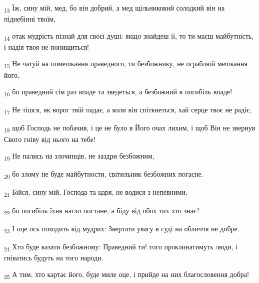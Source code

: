 \begin{tcolorbox}
\textsubscript{13} Їж, сину мій, мед, бо він добрий, а мед щільниковий солодкий він на піднебінні твоїм,
\end{tcolorbox}
\begin{tcolorbox}
\textsubscript{14} отак мудрість пізнай для своєї душі: якщо знайдеш її, то ти маєш майбутність, і надія твоя не понищиться!
\end{tcolorbox}
\begin{tcolorbox}
\textsubscript{15} Не чатуй на помешкання праведного, ти безбожнику, не ограблюй мешкання його,
\end{tcolorbox}
\begin{tcolorbox}
\textsubscript{16} бо праведний сім раз впаде та зведеться, а безбожний в погибіль впаде!
\end{tcolorbox}
\begin{tcolorbox}
\textsubscript{17} Не тішся, як ворог твій падає, а коли він спіткнеться, хай серце твоє не радіє,
\end{tcolorbox}
\begin{tcolorbox}
\textsubscript{18} щоб Господь не побачив, і це не було в Його очах лихим, і щоб Він не звернув Свого гніву від нього на тебе!
\end{tcolorbox}
\begin{tcolorbox}
\textsubscript{19} Не пались на злочинців, не заздри безбожним,
\end{tcolorbox}
\begin{tcolorbox}
\textsubscript{20} бо злому не буде майбутности, світильник безбожних погасне.
\end{tcolorbox}
\begin{tcolorbox}
\textsubscript{21} Бійся, сину мій, Господа та царя, не водися з непевними,
\end{tcolorbox}
\begin{tcolorbox}
\textsubscript{22} бо погибіль їхня нагло постане, а біду від обох тих хто знає?
\end{tcolorbox}
\begin{tcolorbox}
\textsubscript{23} І оце ось походить від мудрих: Звертати увагу в суді на обличчя не добре.
\end{tcolorbox}
\begin{tcolorbox}
\textsubscript{24} Хто буде казати безбожному: Праведний ти! того проклинатимуть люди, і гніватись будуть на того народи.
\end{tcolorbox}
\begin{tcolorbox}
\textsubscript{25} А тим, хто картає його, буде миле оце, і прийде на них благословення добра!
\end{tcolorbox}
